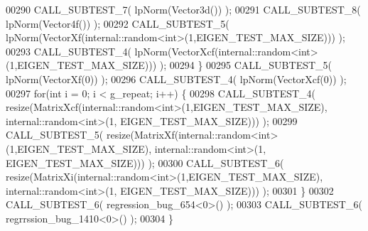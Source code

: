 \begin{DoxyCode}
00290     CALL\_SUBTEST\_7( lpNorm(Vector3d()) );
00291     CALL\_SUBTEST\_8( lpNorm(Vector4f()) );
00292     CALL\_SUBTEST\_5( lpNorm(VectorXf(internal::random<int>(1,EIGEN\_TEST\_MAX\_SIZE))) );
00293     CALL\_SUBTEST\_4( lpNorm(VectorXcf(internal::random<int>(1,EIGEN\_TEST\_MAX\_SIZE))) );
00294   \}
00295   CALL\_SUBTEST\_5( lpNorm(VectorXf(0)) );
00296   CALL\_SUBTEST\_4( lpNorm(VectorXcf(0)) );
00297   \textcolor{keywordflow}{for}(\textcolor{keywordtype}{int} i = 0; i < g\_repeat; i++) \{
00298     CALL\_SUBTEST\_4( resize(MatrixXcf(internal::random<int>(1,EIGEN\_TEST\_MAX\_SIZE), internal::random<int>(1,
      EIGEN\_TEST\_MAX\_SIZE))) );
00299     CALL\_SUBTEST\_5( resize(MatrixXf(internal::random<int>(1,EIGEN\_TEST\_MAX\_SIZE), internal::random<int>(1,
      EIGEN\_TEST\_MAX\_SIZE))) );
00300     CALL\_SUBTEST\_6( resize(MatrixXi(internal::random<int>(1,EIGEN\_TEST\_MAX\_SIZE), internal::random<int>(1,
      EIGEN\_TEST\_MAX\_SIZE))) );
00301   \}
00302   CALL\_SUBTEST\_6( regression\_bug\_654<0>() );
00303   CALL\_SUBTEST\_6( regrrssion\_bug\_1410<0>() );
00304 \}
\end{DoxyCode}
